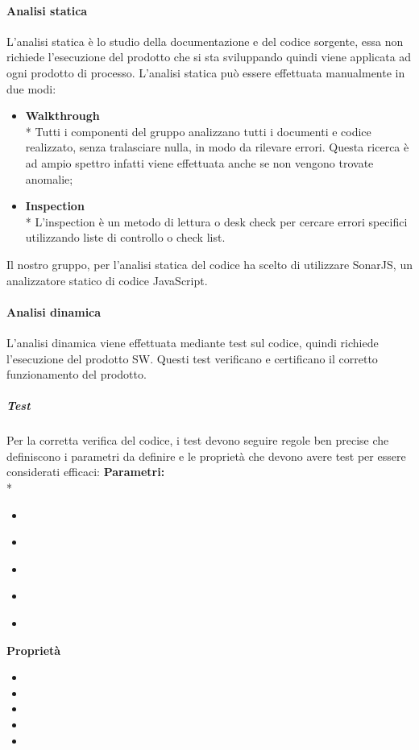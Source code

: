 		\paragraph{Analisi statica}
			L'analisi statica è lo studio della documentazione e del codice sorgente, essa non richiede l'esecuzione del prodotto che si sta sviluppando quindi viene applicata ad ogni prodotto di processo. L'analisi statica può essere effettuata manualmente in due modi:
			\begin{itemize}
				\item \textbf{Walkthrough} \\*
					Tutti i componenti del gruppo analizzano tutti i documenti e codice realizzato, senza tralasciare nulla, in modo da rilevare errori. Questa ricerca è ad ampio spettro infatti viene effettuata anche se non vengono trovate anomalie;
				\item \textbf{Inspection} \\*
					L'inspection è un metodo di lettura o desk check per cercare errori specifici utilizzando liste di controllo o check list.
			\end{itemize}
			Il nostro gruppo, per l'analisi statica del codice ha scelto di utilizzare SonarJS\glo, un analizzatore statico di codice JavaScript. 
		\paragraph{Analisi dinamica}
			L'analisi dinamica viene effettuata mediante test sul codice, quindi richiede l'esecuzione del prodotto SW. Questi test verificano e certificano il corretto funzionamento del prodotto. 
			\subparagraph{Test}
				Per la corretta verifica del codice, i test devono seguire regole ben precise che definiscono i parametri da definire e le proprietà che devono avere test per essere considerati efficaci:
				\textbf{Parametri:} \\*
				\begin{itemize}
					\item \textbf{}
					\item \textbf{}
					\item \textbf{}
					\item \textbf{}
					\item \textbf{}
				\end{itemize}
				
				\textbf{Proprietà}
				\begin{itemize}
					\item
					\item
					\item
					\item
					\item
				\end{itemize}
			
			
			
			
			
			
			
			
			
			
			
			
			
			
			
			
			
			
			
			
			